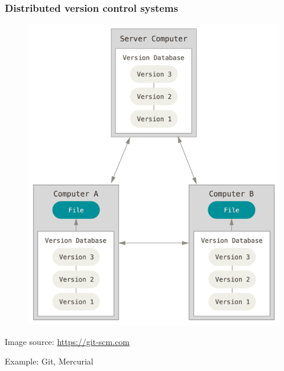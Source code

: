 \documentclass[11pt]{beamer}
\begin{document}
\begin{frame}[fragile]
\frametitle{Distributed version control systems}

\centering
\begin{figure}[htp]
 \includegraphics[scale=0.22]{distributed.png}
\end{figure}
 \tiny{Image source: \url{https://git-scm.com}}

\centering
\footnotesize{Example: Git, Mercurial}\\
\end{frame}



\end{document}

